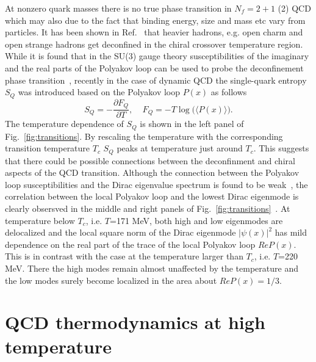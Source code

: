 \documentclass{PoS}
\newcommand{\be}{\begin{equation}}
\newcommand{\ee}{\end{equation}}
\begin{document}
At nonzero quark masses there is no true phase transition in $N_f=2+1$ (2) QCD which may also due to the fact that binding energy, size and mass etc vary from particles.
It has been shown in Ref.~\cite{Bazavov:2013dta,Bazavov:2014yba} that heavier hadrons, e.g. open charm and open strange hadrons get deconfined in the chiral crossover temperature region. 
While it is found that in the SU(3) gauge theory susceptibilities of the imaginary and the real parts of the Polyakov loop can be used to probe the deconfinement phase transition~\cite{Lo:2013etb},
recently in the case of dynamic QCD the single-quark entropy $S_Q$ was introduced based on the Polyakov loop $P(x)$ as follows
\be
S_Q = -\frac{\partial F_Q}{\partial T},~~~~~F_Q = - T \log\Big(\langle P(x)\rangle\Big).
\ee
The temperature dependence of $S_Q$ is shown in the left panel of Fig.~\ref{fig:transitions}. By rescaling the temperature with the corresponding transition temperature $T_c$  $S_Q$
peaks at temperature just around $T_c$. This suggests that there could be possible connections between the deconfinment and chiral aspects of the QCD transition.
Although the connection between the Polyakov loop susceptibilities and the Dirac eigenvalue spectrum is found to be weak~\cite{Doi:2015kje,Suganuma:2016lnt}, the correlation between the local Polyakov loop
and the lowest Dirac eigenmode is clearly obsersved in the middle and right panels of Fig.~\ref{fig:transitions}~\cite{Cossu:2016scb}. At temperature below $T_c$, i.e. $T$=171 MeV, both high and low eigenmodes are delocalized and the local square norm of the Dirac eigenmode $|\psi(x)|^2$ has mild dependence on the real part of the trace of the local Polyakov loop $ReP(x)$. This is in contrast with the case at the temperature larger than $T_c$, i.e. $T$=220 MeV.
There the high modes remain almost unaffected by the temperature and the low modes surely become localized in the area about $ReP(x)=1/3$.



%



\section{QCD thermodynamics at high temperature}
\label{sec:Thermodynamics}
\end{document}
